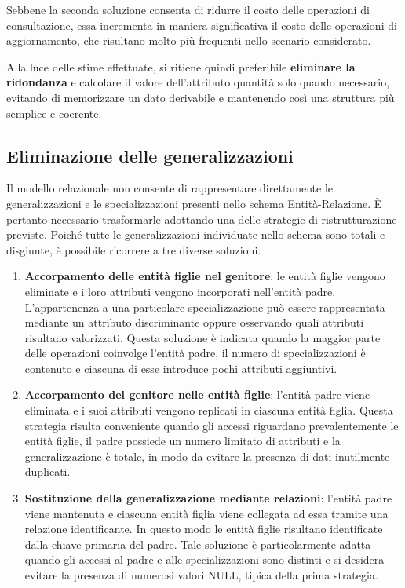 \documentclass[11pt,a4paper]{article}
\begin{document}
Sebbene la seconda soluzione consenta di ridurre il costo delle operazioni di consultazione,
essa incrementa in maniera significativa il costo delle operazioni di aggiornamento, che
risultano molto più frequenti nello scenario considerato.

Alla luce delle stime effettuate, si ritiene quindi preferibile \textbf{eliminare la
ridondanza} e calcolare il valore dell'attributo quantità solo quando necessario, evitando di
memorizzare un dato derivabile e mantenendo così una struttura più semplice e coerente.

\subsection{Eliminazione delle generalizzazioni}

Il modello relazionale non consente di rappresentare direttamente le generalizzazioni e le
specializzazioni presenti nello schema Entità-Relazione. È pertanto necessario trasformarle
adottando una delle strategie di ristrutturazione previste. Poiché tutte le generalizzazioni
individuate nello schema sono totali e disgiunte, è possibile ricorrere a tre diverse soluzioni.

\begin{enumerate}[nosep]
  \item \textbf{Accorpamento delle entità figlie nel genitore}: le entità figlie vengono
    eliminate e i loro attributi vengono incorporati nell'entità padre. L'appartenenza a una
    particolare specializzazione può essere rappresentata mediante un attributo discriminante
    oppure osservando quali attributi risultano valorizzati. Questa soluzione è indicata quando
    la maggior parte delle operazioni coinvolge l'entità padre, il numero di specializzazioni è
    contenuto e ciascuna di esse introduce pochi attributi aggiuntivi.
  \item \textbf{Accorpamento del genitore nelle entità figlie}: l'entità padre viene eliminata e
    i suoi attributi vengono replicati in ciascuna entità figlia. Questa strategia risulta
    conveniente quando gli accessi riguardano prevalentemente le entità figlie, il padre
    possiede un numero limitato di attributi e la generalizzazione è totale, in modo da evitare
    la presenza di dati inutilmente duplicati.
  \item \textbf{Sostituzione della generalizzazione mediante relazioni}: l'entità padre viene
    mantenuta e ciascuna entità figlia viene collegata ad essa tramite una relazione
    identificante. In questo modo le entità figlie risultano identificate dalla chiave primaria
    del padre. Tale soluzione è particolarmente adatta quando gli accessi al padre e alle
    specializzazioni sono distinti e si desidera evitare la presenza di numerosi valori NULL,
    tipica della prima strategia.
\end{enumerate}
\end{document}
